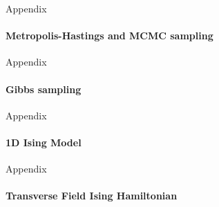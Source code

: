 \documentclass{beamer}
\begin{document}
\begin{frame}{Appendix}
\framesubtitle{Metropolis-Hastings and MCMC sampling}
\end{frame}

\begin{frame}{Appendix}
\framesubtitle{Gibbs sampling}
\end{frame}

\begin{frame}{Appendix}
\framesubtitle{1D Ising Model}
\end{frame}

\begin{frame}{Appendix}
\framesubtitle{Transverse Field Ising Hamiltonian}
\end{frame}
\end{document}
